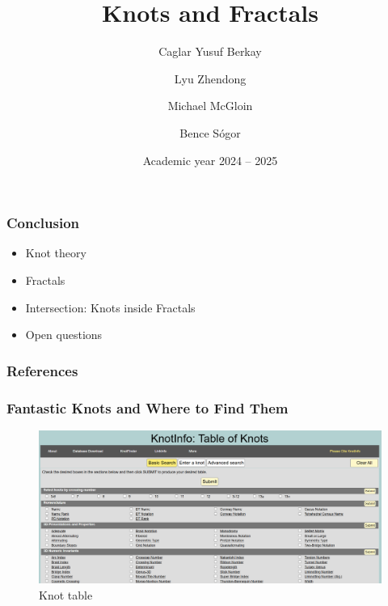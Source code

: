 \documentclass
   [kul] %
   {style/kulakbeamer}
\title{Knots and Fractals}
\author[Short name]{Caglar Yusuf Berkay \and Lyu Zhendong \and Michael McGloin \and Bence Sógor}
\institute{KU Leuven}
\date{Academic year 2024 -- 2025}
\begin{document}
\begin{titleframe}
\titlepage
\end{titleframe}

\begin{outlineframe}[Outline] %
\tableofcontents
\end{outlineframe}











\begin{frame}
\frametitle{Conclusion} %
\begin{itemize}
	\item Knot theory
	\item Fractals
	\item Intersection: Knots inside Fractals
	\item Open questions
\end{itemize}
\end{frame}


\begin{frame}[allowframebreaks]
    \frametitle{References}
%    
     \printbibliography
\end{frame}

\begin{frame}
	\frametitle{Fantastic Knots and Where to Find Them}
	\begin{figure}[h]
		\centering
		\includegraphics[width=0.8\linewidth]{images/KnotTable}
		\caption{Knot table \cite{knotinfo}}
		\label{fig:enter-label}
	\end{figure}
\end{frame}
\end{document}
